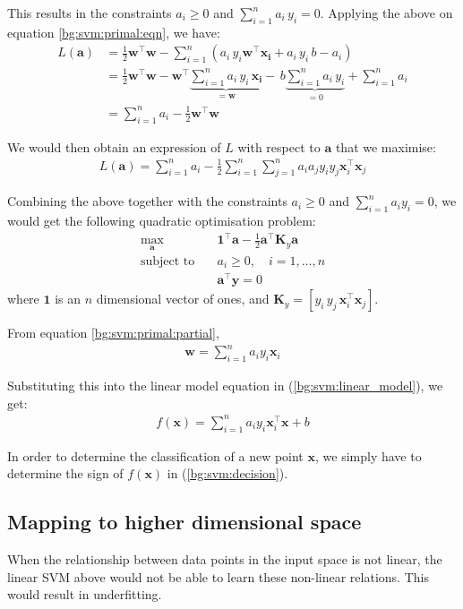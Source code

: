 \documentclass[12pt, twoside, a4paper]{report}
\def\vec{\boldsymbol}
\begin{document}
This results in the constraints $a_i \geq 0$ and $\sum_{i=1}^n a_i \, y_i = 0$. Applying the above on equation \ref{bg:svm:primal:eqn}, we have:
\begin{align*}
L(\vec{a}) &= \frac{1}{2} \vec{w}^\top \vec{w} - \sum_{i=1}^n \left( a_i \, y_i \vec{w}^\top \vec{x_i} + a_i\,y_i \, b - a_i \right) \\
&= \frac{1}{2} \vec{w}^\top \vec{w} - \vec{w}^\top \underbrace{\sum_{i=1}^n  a_i \, y_i \, \vec{x_i}}_{=\vec{w}} - \, b \underbrace{ \sum_{i=1}^n a_i\,y_i}_{=0} + \sum_{i=1}^n a_i \\
&= \sum_{i=1}^n a_i - \frac{1}{2} \vec{w}^\top \vec{w}
\end{align*}

We would then obtain an expression of $L$ with respect to $\vec a$ that we maximise:
\begin{align*}
L(\vec a) = \sum_{i=1}^n a_i - \frac{1}{2} \sum_{i=1}^n \sum_{j=1}^n a_i a_j y_i y_j \vec{x}_i^\top \vec{x}_j
\end{align*}

Combining the above together with the constraints $a_i \geq 0$ and $\sum_{i=1}^n a_i y_i = 0$, we would get the following quadratic optimisation problem:
\begin{align*}
\max_{\vec a} \quad &\vec{1}^\top \vec a - \frac{1}{2} \vec{a}^\top \vec{K}_y \vec{a} \\
\text{subject to} \quad &a_i \geq 0, \quad i = 1, \dots , n \\
&\vec{a}^\top \vec y = 0
\end{align*}
where $\vec{1}$ is an $n$ dimensional vector of ones, and $\vec{K}_y = \left[ y_i \, y_j \, \vec{x}_i^\top \vec{x}_j \right]$.

From equation \ref{bg:svm:primal:partial},
\begin{align*}
\vec{w} = \sum_{i=1}^n a_i y_i \vec{x}_i
\end{align*}

Substituting this into the linear model equation in (\ref{bg:svm:linear_model}), we get:
\begin{align}
f(\vec{x}) = \sum_{i=1}^n a_i y_i \vec{x}_i^\top \vec{x} + b \label{bg:svm:decision}
\end{align}

In order to determine the classification of a new  point $\vec{x}$, we simply have to determine the sign of $f(\vec{x})$ in (\ref{bg:svm:decision}).

\subsection{Mapping to higher dimensional space}
When the relationship between data points in the input space is not linear, the linear SVM above would not be able to learn these non-linear relations. This would result in underfitting.
\end{document}
